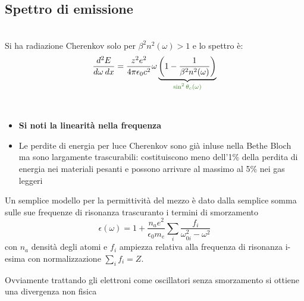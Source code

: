 \subsection{Spettro di emissione}
\begin{theorem*} \hfill \\ 
    Si ha radiazione Cherenkov solo per $\beta ^{2} n^{2} (\omega )>1$ e lo spettro è:
    \[\frac{d^{2}  E}{ d\omega  \: dx}  = \frac{z^{2} e^{2} }{4\pi \epsilon _{0} c^{2} }\omega \mathexplain[cd]{\left( 1-\frac{1}{\beta ^{2} n^{2}(\omega ) } \right)}{\sin ^{2} \theta _{c} (\omega )}  \]
\end{theorem*}

\begin{remark} \hfill \\
    \vspace{-20pt}
    \begin{itemize}
        \item \textbf{Si noti la linearità nella frequenza} 
        \item Le perdite di energia per luce Cherenkov sono già inluse nella Bethe Bloch ma sono largamente trascurabili: costituiscono meno dell'1\% della perdita di energia nei materiali pesanti e possono arrivare al massimo al 5\% nei gas leggeri
    \end{itemize}


\end{remark}
Un semplice modello per la permittività del mezzo è dato dalla semplice somma sulle sue frequenze di risonanza trascuranto i termini di smorzamento
\[\epsilon(\omega)=1+\frac{n_ae^2}{\epsilon_0m_e}\sum_i \frac{f_i}{\omega_{0i}^2-\omega^2}\]
con $n_a$ densità degli atomi e $f_i$ ampiezza relativa alla frequenza di risonanza i-esima con normalizzazione $\sum_i f_i=Z$.
\begin{note} 
    Ovviamente trattando gli elettroni come oscillatori senza smorzamento si ottiene una divergenza non fisica

\end{note}



